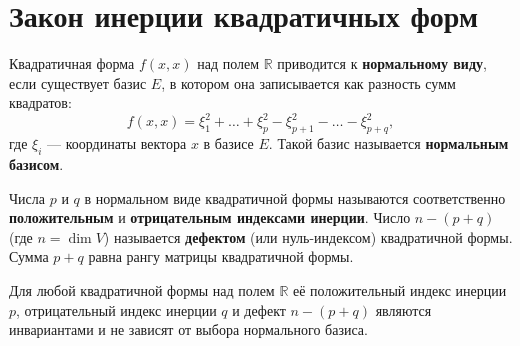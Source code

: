 \section{Закон инерции квадратичных форм}

\begin{definition}
Квадратичная форма $f(x, x)$ над полем $\mathbb{R}$ приводится к \textbf{нормальному виду}, если существует базис $E$, в котором она записывается как разность сумм квадратов:
\[
f(x, x) = \xi_1^2 + \dots + \xi_p^2 - \xi_{p+1}^2 - \dots - \xi_{p+q}^2,
\]
где $\xi_i$ --- координаты вектора $x$ в базисе $E$. Такой базис называется \textbf{нормальным базисом}.
\end{definition}

\begin{definition}
Числа $p$ и $q$ в нормальном виде квадратичной формы называются соответственно \textbf{положительным} и \textbf{отрицательным индексами инерции}. 
Число $n - (p + q)$ (где $n = \dim V$) называется \textbf{дефектом} (или нуль-индексом) квадратичной формы. Сумма $p + q$ равна рангу матрицы квадратичной формы.
\end{definition}

\begin{theorem}
Для любой квадратичной формы над полем $\mathbb{R}$ её положительный индекс инерции $p$, отрицательный индекс инерции $q$ и дефект $n - (p + q)$ являются инвариантами и не зависят от выбора нормального базиса.
\end{theorem}

